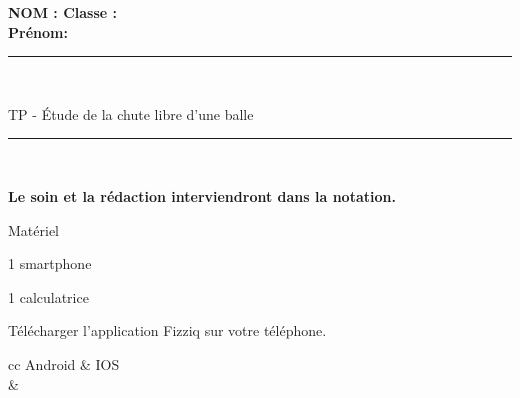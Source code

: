 \documentclass[11pt,a4paper]{article}
\newenvironment{itemize*}%
    {\begin{itemize}%
      \setlength{\itemsep}{0pt}%
      \setlength{\parskip}{0pt}}%
    {\end{itemize}}
\begin{document}


\flushleft \textbf{NOM : \hfill Classe : \hspace{3cm} ~~\\[2mm]
Prénom:\\[0,4cm]
}
\hrule\

\begin{center}
 \LARGE{TP - Étude de la chute libre d'une balle  }
\end{center}


\normalsize

\hrule\
\\[0,2cm]
   \begin{center}
   \textbf{Le soin et la rédaction interviendront dans la notation.}
   \end{center} 

\noindent%
\begin{minipage}{.35\textwidth}%

    
 \begin{bclogo}[couleur=blue!30 ,  arrondi =0.1 , logo = \bcinfo, epBarre =2]{ Matériel }

\begin{itemize*}
    \item 1 smartphone 
    \item 1 calculatrice


\end{itemize*}
\end{bclogo}

\end{minipage}%
\hfill 
\begin{minipage}{.6\textwidth}%
\begin{center}

    \item Télécharger l'application Fizziq sur votre téléphone. \\

    
 


     \begin{tabular}{cc}
         Android & IOS\\
           & \\
     \end{tabular}





\end{center}
\end{minipage}%
\end{document}
